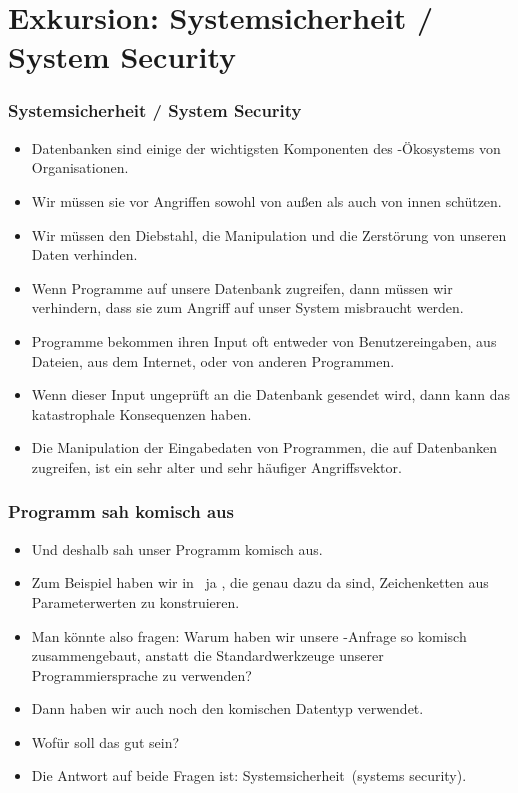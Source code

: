 \documentclass[aspectratio=169,mathserif,notheorems]{beamer}%
\begin{document}
\section{Exkursion: Systemsicherheit / System Security}
%
\begin{frame}%
\frametitle{Systemsicherheit / System Security}%
\begin{itemize}%
\item Datenbanken sind einige der wichtigsten Komponenten des \nobreakdashes-Ökosystems von Organisationen.%
\item<2-> Wir müssen sie vor Angriffen sowohl von außen als auch von innen schützen.%
\item<3-> Wir müssen den Diebstahl, die Manipulation und die Zerstörung von unseren Daten verhinden.%
\item<4-> Wenn Programme auf unsere Datenbank zugreifen, dann müssen wir verhindern, dass sie zum Angriff auf unser System misbraucht werden.%
\item<5-> Programme bekommen ihren Input oft entweder von Benutzereingaben, aus Dateien, aus dem Internet, oder von anderen Programmen.%
\item<6-> Wenn dieser Input ungeprüft an die Datenbank gesendet wird, dann kann das katastrophale Konsequenzen haben.%
\item<7-> Die Manipulation der Eingabedaten von Programmen, die auf Datenbanken zugreifen, ist ein sehr alter und sehr häufiger Angriffsvektor\cite{S2008SI}.%
\end{itemize}%
\end{frame}%
%
\begin{frame}%
\frametitle{Programm sah komisch aus}%
\begin{itemize}%
\item Und deshalb sah unser Programm komisch aus.%
\item<2-> Zum Beispiel haben wir in \python\ ja , die genau dazu da sind, Zeichenketten aus Parameterwerten zu konstruieren.%
\item<3-> Man könnte also fragen: Warum haben wir unsere -Anfrage so komisch zusammengebaut, anstatt die Standardwerkzeuge unserer Programmiersprache zu verwenden?%
\item<4-> Dann haben wir auch noch den komischen Datentyp  verwendet.%
\item<5-> Wofür soll das gut sein?%
\item<6-> Die Antwort auf beide Fragen ist: \alert{Systemsicherheit}~(systems security).%
\end{itemize}%
\end{frame}%
\end{document}
